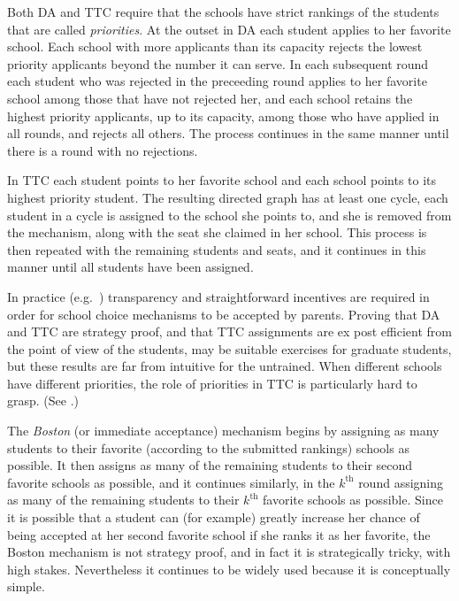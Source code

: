 \documentclass[12pt, A4paper]{article}
\theoremstyle{definition}
\begin{document}
Both DA and TTC require that the schools have strict rankings of the students that are called \emph{priorities}.  At the outset in DA each student applies to her favorite school.  Each school with more applicants than its capacity rejects the lowest priority applicants beyond the number it can serve.  In each subsequent round each student who was rejected in the preceeding round applies to her favorite school among those that have not rejected her, and each school retains the highest priority applicants, up to its capacity, among those who have applied in all rounds, and rejects all others.  The process continues in the same manner until there is a round with no rejections.  

In TTC each student points to her favorite school and each school points to its highest priority student. The resulting directed graph has at least one cycle, each student in a cycle is assigned to the school she points to, and she is removed from the mechanism, along with the seat she claimed in her school.  This process is then repeated with the remaining students and seats, and it continues in this manner until all students have been assigned.

In practice (e.g.~\cite{Pat17}) transparency and straightforward incentives are required in order for school choice mechanisms to be accepted by parents.  Proving that DA and TTC are strategy proof, and that TTC assignments are ex post efficient from the point of view of the students, may be suitable exercises for graduate students, but these results are far from intuitive for the untrained.  When different schools have different priorities, the role of priorities in TTC is particularly hard to grasp.  (See \cite{LeLo20}.)  

The \emph{Boston} (or immediate acceptance) mechanism begins by assigning as many students to their favorite (according to the submitted rankings) schools as possible.  It then assigns as many of the remaining students to their second favorite schools as possible, and it continues similarly, in the $k^{\text{th}}$ round assigning as many of the remaining students to their  $k^{\text{th}}$ favorite schools as possible.  Since it is possible that a student can (for example) greatly increase her chance of being accepted at her second favorite school if she ranks it as her favorite, the Boston mechanism is not strategy proof, and in fact it is strategically tricky, with high stakes.  Nevertheless it continues to be widely used because it is conceptually simple.  
\end{document}
